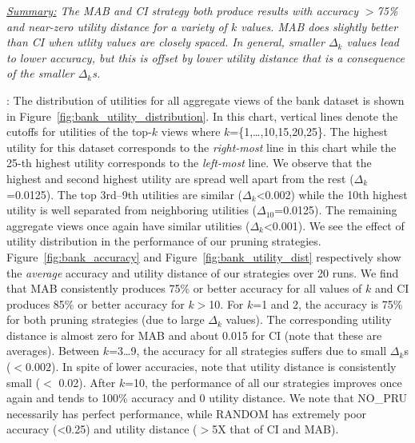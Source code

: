 {\em \underline{Summary:} The MAB and CI strategy both produce results with 
accuracy $>$75\% and near-zero utility distance for a variety of $k$ values.
MAB does slightly better than CI when utlity values are closely spaced.
In general, smaller $\Delta_k$ values lead to lower accuracy, but this is offset by
lower utility distance that is a consequence of the smaller $\Delta_k$s. 
}


:
The distribution of utilities for all aggregate views of the bank dataset is
shown in Figure~\ref{fig:bank_utility_distribution}. 
In this chart, vertical lines denote the cutoffs for utilities of the top-$k$ views
where $k$=\{1,\ldots,10,15,20,25\}.
The highest utility for this dataset corresponds to the {\it right-most} line
in this chart while the 25-th highest utility corresponds to the {\it left-most}
line. 
We observe that the highest and second highest utility are spread well apart 
from the rest ($\Delta_k$=0.0125). 
The top 3rd--9th utilities are similar ($\Delta_k$<0.002) while the 10th highest 
utility is well separated from neighboring utilities ($\Delta_{10}$=0.0125).
The remaining aggregate views once again have similar utilities ($\Delta_k$<0.001).
We see the effect of utility distribution in the performance of our pruning 
strategies.
Figure~\ref{fig:bank_accuracy} and Figure~\ref{fig:bank_utility_dist} respectively show
the {\em average} accuracy and utility distance of our strategies over 20 runs.
We find that MAB consistently produces 75\% or better accuracy for all values of $k$ and
CI produces 85\% or better accuracy for $k$$>$10.
For $k$=1 and 2, the accuracy is 75\% for both pruning strategies (due to large 
$\Delta_k$ values).
The corresponding utility distance is almost zero for MAB and about 0.015 for CI (note that these
are averages).
Between $k$=3\ldots9, the accuracy for all strategies suffers due to small $\Delta_k$s ($< 0.002$).
In spite of lower accuracies, note that utility distance is consistently small ($<$ 0.02).
After $k$=10, the performance of all our strategies improves once again and tends to 100\% accuracy and
0 utility distance.
We note that NO\_PRU necessarily has perfect performance, while RANDOM has extremely poor accuracy (<0.25) 
and utility distance ($>$5X that of CI and MAB). 

